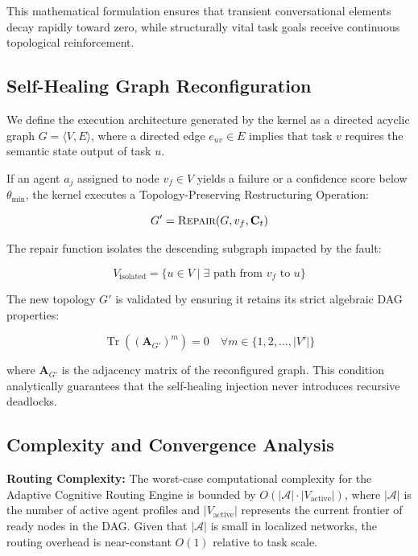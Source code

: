 \documentclass[conference]{IEEEtran}
\newcommand{\trace}{\operatorname{Tr}}
\begin{document}
This mathematical formulation ensures that transient conversational elements decay rapidly toward zero, while structurally vital task goals receive continuous topological reinforcement.

\subsection{Self-Healing Graph Reconfiguration}

We define the execution architecture generated by the kernel as a directed acyclic graph $G = \langle V, E \rangle$, where a directed edge $e_{uv} \in E$ implies that task $v$ requires the semantic state output of task $u$.

If an agent $a_j$ assigned to node $v_f \in V$ yields a failure or a confidence score below $\theta_{\min}$, the kernel executes a Topology-Preserving Restructuring Operation:

\begin{equation}
    G' = \textsc{Repair}(G, v_f, \mathbf{C}_t)
    \label{eq:repair}
\end{equation}

The repair function isolates the descending subgraph impacted by the fault:

\begin{equation}
    V_{\mathrm{isolated}} = \{ u \in V \mid \exists \text{ path from } v_f \text{ to } u \}
    \label{eq:isolated}
\end{equation}

The new topology $G'$ is validated by ensuring it retains its strict algebraic DAG properties:

\begin{equation}
    \trace((\mathbf{A}_{G'})^m) = 0 \quad \forall m \in \{1, 2, \ldots, |V'|\}
    \label{eq:acyclic}
\end{equation}

where $\mathbf{A}_{G'}$ is the adjacency matrix of the reconfigured graph. This condition analytically guarantees that the self-healing injection never introduces recursive deadlocks.

\subsection{Complexity and Convergence Analysis}

\textbf{Routing Complexity:} The worst-case computational complexity for the Adaptive Cognitive Routing Engine is bounded by $O(|\mathcal{A}| \cdot |V_{\mathrm{active}}|)$, where $|\mathcal{A}|$ is the number of active agent profiles and $|V_{\mathrm{active}}|$ represents the current frontier of ready nodes in the DAG. Given that $|\mathcal{A}|$ is small in localized networks, the routing overhead is near-constant $O(1)$ relative to task scale.
\end{document}
